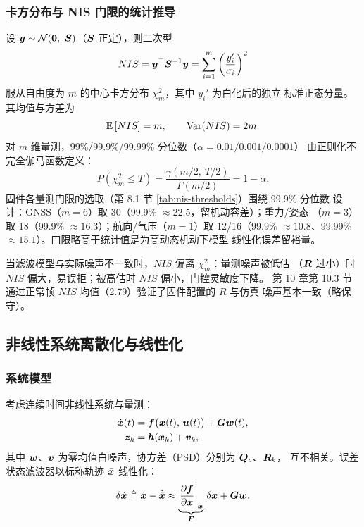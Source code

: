 \subsubsection{卡方分布与 NIS 门限的统计推导}

设 $\vp{y} \sim \mathcal{N}(\m{0},\ \m{S})$（$\boldsymbol{S}$ 正定），则二次型
\begin{equation}
  NIS = \boldsymbol{y}^{\top}\boldsymbol{S}^{-1}\boldsymbol{y} = \sum_{i=1}^{m} \left(\frac{y_i'}{\sigma_i}\right)^2
  \label{eq:nis-chi2}
\end{equation}
服从自由度为 $m$ 的中心卡方分布 $\chi^2_m$，其中 $y_i'$ 为白化后的独立
标准正态分量。其均值与方差为
\begin{equation}
  \mathbb{E}\left[NIS\right] = m, \qquad \operatorname{Var}(NIS) = 2m.
  \label{eq:nis-moments}
\end{equation}
对 $m$ 维量测，99\%/99.9\%/99.99\% 分位数（$\alpha = 0.01/0.001/0.0001$）
由正则化不完全伽马函数定义：
\begin{equation}
  P(\chi^2_m \le T) = \frac{\gamma(m/2,\ T/2)}{\Gamma(m/2)} = 1 - \alpha.
  \label{eq:chi2-quantile}
\end{equation}
固件各量测门限的选取（第 8.1 节 \cref{tab:nis-thresholds}）围绕 99.9\% 分位数
设计：GNSS（$m=6$）取 30（99.9\% $\approx22.5$，留机动容差）；重力/姿态
（$m=3$）取 18（99.9\% $\approx16.3$）；航向/气压（$m=1$）取 12/16（99.9\%
$\approx10.8$、99.99\% $\approx15.1$）。门限略高于统计值是为高动态机动下模型
线性化误差留裕量。

当滤波模型与实际噪声不一致时，$NIS$ 偏离 $\chi^2_m$：量测噪声被低估
（$\boldsymbol{R}$ 过小）时 $NIS$ 偏大，易误拒；被高估时 $NIS$ 偏小，门控灵敏度下降。
第 10 章第 10.3 节通过正常帧 $NIS$ 均值（2.79）验证了固件配置的 $R$ 与仿真
噪声基本一致（略保守）。

\subsection{非线性系统离散化与线性化}

\subsubsection{系统模型}

考虑连续时间非线性系统与量测：
\begin{align}
  \dot{\boldsymbol{x}}(t) &= \boldsymbol{f}\big(\boldsymbol{x}(t),\,\boldsymbol{u}(t)\big) + \boldsymbol{G}\boldsymbol{w}(t),
  \label{eq:cont-sys} \\
  \boldsymbol{z}_k &= \boldsymbol{h}(\boldsymbol{x}_k) + \boldsymbol{v}_k,
  \label{eq:meas-sys}
\end{align}
其中 $\boldsymbol{w}$、$\boldsymbol{v}$ 为零均值白噪声，协方差（PSD）分别为 $\boldsymbol{Q}_c$、$\boldsymbol{R}_k$，
互不相关。误差状态滤波器以标称轨迹 $\bar{\boldsymbol{x}}$ 线性化：
\begin{equation}
  \delta\dot{\boldsymbol{x}} \triangleq \dot{\boldsymbol{x}} - \dot{\bar{\boldsymbol{x}}}
  \approx \underbrace{\left.\frac{\partial \boldsymbol{f}}{\partial \boldsymbol{x}}\right|_{\bar{\boldsymbol{x}}}
  }_{\boldsymbol{F}}\,\delta\boldsymbol{x} + \boldsymbol{G}\boldsymbol{w}.
  \label{eq:error-sys}
\end{equation}

